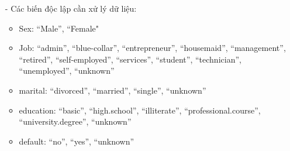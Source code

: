 \documentclass{report}
\newcommand\tab[1][1.25cm]{\hspace*{#1}}
\begin{document}
\begin{enumerate}
                    \item [- ] Các biến độc lập cần xử lý dữ liệu:
                        \begin{itemize}
                        \item Sex:
                                \newline\tab “Male”, “Female"
                            \item Job:
                                \newline\tab “admin”, “blue-collar”, “entrepreneur”, “housemaid”,
                                \newline\tab “management”, “retired”, “self-employed”, “services”,
                                \newline\tab “student”, “technician”, “unemployed”, “unknown”
                            \item marital:
                                \newline\tab “divorced”, “married”, “single”, “unknown”
                            \item education:
                                \newline\tab “basic”, “high.school”, “illiterate”, “professional.course”, 
                                \newline\tab “university.degree”, “unknown”
                            \item default:
                                \newline\tab “no”, “yes”, “unknown”
                                

\end{itemize}
\end{enumerate}
\end{document}
